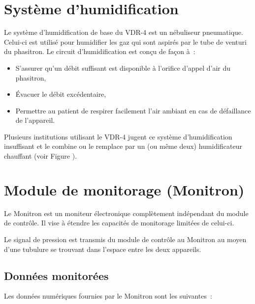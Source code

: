 \section{Système d’humidification}

Le système d’humidification de base du VDR-4 est un nébuliseur pneumatique.
Celui-ci est utilisé pour humidifier les gaz qui sont aspirés par le tube de
venturi du phasitron. Le circuit d’humidification est conçu de façon à :

\begin{itemize}
	\item S’assurer qu’un débit suffisant est disponible à l’orifice d’appel d’air du phasitron,
	\item Évacuer le débit excédentaire,
	\item Permettre au patient de respirer facilement l’air ambiant en cas de défaillance de l’appareil.
\end{itemize}

Plusieurs institutions utilisant le VDR-4 jugent ce système 
d’humidification insuffisant et le combine ou le remplace par un 
(ou même deux) humidificateur chauffant (voir Figure 
).



\section{Module de monitorage (Monitron)}

Le Monitron est un moniteur électronique complètement indépendant du module de
contrôle. Il vise à étendre les capacités de monitorage limitées de celui-ci.

Le signal de pression est transmis du module de contrôle au Monitron au moyen
d’une tubulure se trouvant dans l’espace entre les deux appareils.

\subsection{Données monitorées}

Les données numériques fournies par le Monitron sont les suivantes :

